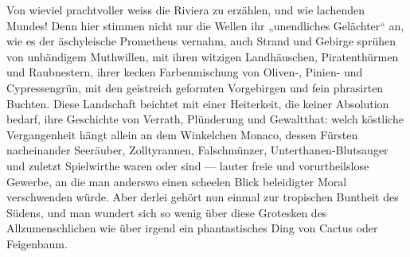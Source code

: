 Von wieviel prachtvoller  weiss die Riviera zu erzählen, und wie lachenden Mundes! Denn hier stimmen nicht nur die Wellen ihr „unendliches Gelächter“ an, wie es der äschyleische Prometheus vernahm, auch Strand und Gebirge sprühen von unbändigem Muthwillen, mit ihren witzigen Landhäuschen, Piratenthürmen und Raubnestern, ihrer kecken Farbenmischung von Oliven-, Pinien- und Cypressengrün, mit den geistreich geformten Vorgebirgen und fein phrasirten Buchten. Diese Landschaft beichtet mit einer Heiterkeit, die keiner Absolution bedarf, ihre Geschichte von Verrath, Plünderung und Gewaltthat: welch köstliche Vergangenheit hängt allein an dem Winkelchen Monaco, dessen Fürsten nacheinander Seeräuber, Zolltyrannen, Falschmünzer, Unterthanen-Blutsauger und zuletzt Spielwirthe waren oder sind — lauter freie und vorurtheilslose Gewerbe, an die man anderswo einen scheelen Blick beleidigter Moral verschwenden würde. Aber derlei gehört nun einmal zur tropischen Buntheit des Südens, und man wundert sich so wenig über diese Grotesken des Allzumenschlichen wie über irgend ein phantastisches Ding von Cactus oder Feigenbaum.
\par


